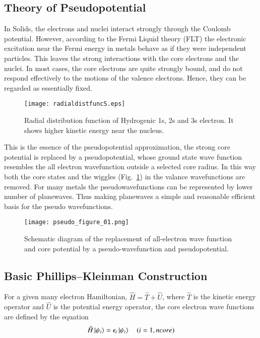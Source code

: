 \subsection{Theory of Pseudopotential}
In Solids, the electrons and nuclei interact strongly through the Coulomb potential. However, according to the Fermi Liquid theory (FLT) the electronic excitation near the Fermi energy in metals behave as if they were independent particles. This leaves the strong interactions with the core electrons and the nuclei. In most cases, the core electrons are quite strongly bound, and do not respond effectively to the motions of the valence electrons. Hence, they can be regarded as essentially fixed.
\begin{figure}
\centering
\texttt{[image: radialdistfuncS.eps]}
\caption{Radial distribution function of Hydrogenic 1s, 2s and 3s electron. It shows higher kinetic energy near the nucleus.}
\label{fig_hydrogen}
\end{figure}
This is the essence of the pseudopotential approximation, the strong core potential is replaced by a pseudopotential, whose ground state wave function resembles the all electron wavefunction outside a selected core radius. In this way both the core states and the wiggles (Fig.~\ref{fig_hydrogen}) in the valance wavefunctions are removed. For many metals the pseudowavefunctions can be represented by lower number of planewaves. Thus making planewaves a simple and reasonable efficient basis for the pseudo wavefunctions.
\begin{figure}
\centering
\texttt{[image: pseudo\_figure\_01.png]}
\caption{Schematic diagram of the replacement of all-electron wave function and core potential by a pseudo-wavefunction and pseudopotential.}
\end{figure}
\subsection{Basic Phillips--Kleinman Construction}
For a given many electron Hamiltonian, $\hat{H}=\hat{T}+\hat{U}$, where $\hat{T}$ is the kinetic energy operator and $\hat{U}$ is the potential energy operator, the core electron wave functions are defined by the \schrod equation
\begin{equation}
 \hat{H}\ket{\psi_i} = \epsilon_i \ket{\psi_i} \quad   (i = 1, n core)
\end{equation}

